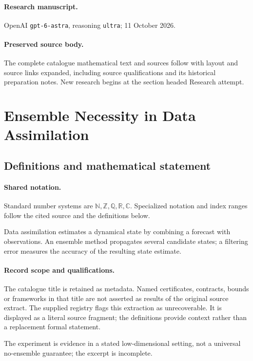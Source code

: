 \documentclass[11pt]{article}
\begin{document}
\paragraph{Research manuscript.} OpenAI \texttt{gpt-6-astra}, reasoning \texttt{ultra}; 11 October 2026.
\paragraph{Preserved source body.} The complete catalogue mathematical text and sources follow with layout and source links expanded, including source qualifications and its historical preparation notes. New research begins at the section headed Research attempt.

\section{Ensemble Necessity in Data Assimilation}\label{statement}

\subsection{Definitions and mathematical statement}

\paragraph{Shared notation.}Standard number systems are $\mathbb N,\mathbb Z,\mathbb Q,\mathbb R,\mathbb C$. Specialized notation and index ranges follow the cited source and the definitions below.


Data assimilation estimates a dynamical state by combining a forecast with observations. An ensemble method propagates several candidate states; a filtering error measures the accuracy of the resulting state estimate.
\paragraph{Record scope and qualifications.}
The catalogue title is retained as metadata. Named certificates, contracts, bounds or frameworks in that title are not asserted as results of the original source extract.
The supplied registry flags this extraction as unrecoverable. It is displayed as a literal source fragment; the definitions provide context rather than a replacement formal statement.

The experiment is evidence in a stated low-dimensional setting, not a universal no-ensemble guarantee; the excerpt is incomplete.
\end{document}
